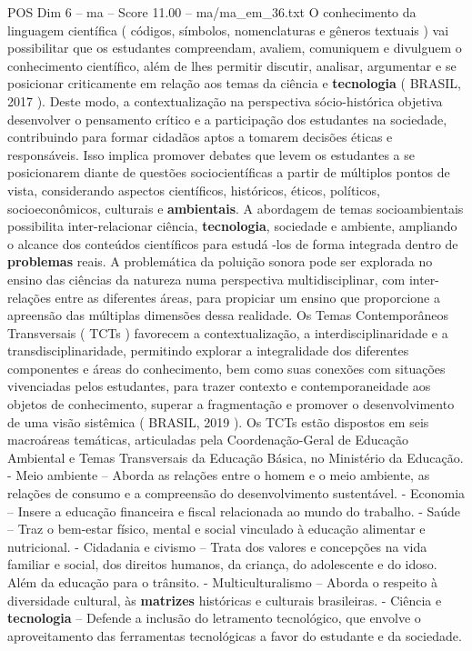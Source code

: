 \begin{textsample}{POS Dim 6 – ma – Score 11.00 – ma/ma\_em\_36.txt}
O conhecimento da linguagem científica ( códigos, símbolos, nomenclaturas e gêneros textuais ) vai possibilitar que os estudantes compreendam, avaliem, comuniquem e divulguem o conhecimento científico, além de lhes permitir discutir, analisar, argumentar e se posicionar criticamente em relação aos temas da ciência e \textbf{tecnologia} ( BRASIL, 2017 ).
Deste modo, a contextualização na perspectiva sócio-histórica objetiva desenvolver o pensamento crítico e a participação dos estudantes na sociedade, contribuindo para formar cidadãos aptos a tomarem decisões éticas e responsáveis.
Isso implica promover debates que levem os estudantes a se posicionarem diante de questões sociocientíficas a partir de múltiplos pontos de vista, considerando aspectos científicos, históricos, éticos, políticos, socioeconômicos, culturais e \textbf{ambientais}.
A abordagem de temas socioambientais possibilita inter-relacionar ciência, \textbf{tecnologia}, sociedade e ambiente, ampliando o alcance dos conteúdos científicos para estudá -los de forma integrada dentro de \textbf{problemas} reais.
A problemática da poluição sonora pode ser explorada no ensino das ciências da natureza numa perspectiva multidisciplinar, com inter-relações entre as diferentes áreas, para propiciar um ensino que proporcione a apreensão das múltiplas dimensões dessa realidade.
Os Temas Contemporâneos Transversais ( TCTs ) favorecem a contextualização, a interdisciplinaridade e a transdisciplinaridade, permitindo explorar a integralidade dos diferentes componentes e áreas do conhecimento, bem como suas conexões com situações vivenciadas pelos estudantes, para trazer contexto e contemporaneidade aos objetos de conhecimento, superar a fragmentação e promover o desenvolvimento de uma visão sistêmica ( BRASIL, 2019 ).
Os TCTs estão dispostos em seis macroáreas temáticas, articuladas pela Coordenação-Geral de Educação Ambiental e Temas Transversais da Educação Básica, no Ministério da Educação. - Meio ambiente – Aborda as relações entre o homem e o meio ambiente, as relações de consumo e a compreensão do desenvolvimento sustentável. - Economia – Insere a educação financeira e fiscal relacionada ao mundo do trabalho. - Saúde – Traz o bem-estar físico, mental e social vinculado à educação alimentar e nutricional. - Cidadania e civismo – Trata dos valores e concepções na vida familiar e social, dos direitos humanos, da criança, do adolescente e do idoso.
Além da educação para o trânsito. - Multiculturalismo – Aborda o respeito à diversidade cultural, às \textbf{matrizes} históricas e culturais brasileiras. - Ciência e \textbf{tecnologia} – Defende a inclusão do letramento tecnológico, que envolve o aproveitamento das ferramentas tecnológicas a favor do estudante e da sociedade.

\end{textsample}
